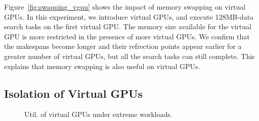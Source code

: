 Figure~\ref{fig:swapping_vgpu} shows the impact of memory swapping on
virtual GPUs.
In this experiment, we introduce virtual GPUs, and execute 128MB-data
search tasks on the first virtual GPU.
The memory size available for the virtual GPU is more restricted in
the presence of more virtual GPUs.
We confirm that the makespans become longer and their refrection points
appear earlier for a greater number of virtual GPUs, but all the search
tasks can still complete.
This explains that memory swapping is also useful on virtual GPUs.

\subsection{Isolation of Virtual GPUs}

\begin{figure}[t]
 \begin{center}
  \vspace{-1em}
  \caption{Util. of virtual GPUs under extreme workloads.}
  \label{fig:vgpu_2}
  \end{center}
  \vspace{-2em}
\end{figure}

